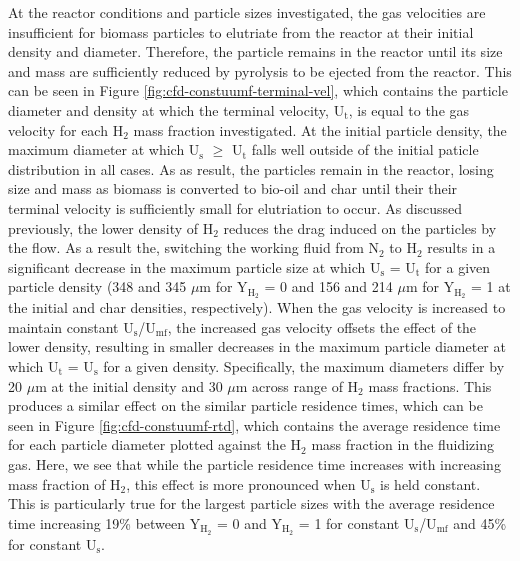 At the reactor conditions and particle sizes investigated, the gas velocities are insufficient for biomass particles to elutriate from the reactor at their initial density and diameter. Therefore, the particle remains in the reactor until its size and mass are sufficiently reduced by pyrolysis to be ejected from the reactor. This can be seen in Figure \ref{fig:cfd-constuumf-terminal-vel}, which contains the particle diameter and density at which the terminal velocity, U$_\text{t}$, is equal to the gas velocity for each H$_2$ mass fraction investigated. At the initial particle density, the maximum diameter at which U$_\text{s}$ $\ge$ U$_\text{t}$ falls well outside of the initial paticle distribution in all cases. As as result, the particles remain in the reactor, losing size and mass as biomass is converted to bio-oil and char until their their terminal velocity is sufficiently small for elutriation to occur. As discussed previously, the lower density of H$_2$ reduces the drag induced on the particles by the flow. As a result the, switching the working fluid from N$_2$ to H$_2$ results in a significant decrease in the maximum particle size at which U$_\text{s}$ = U$_\text{t}$ for a given particle density (348 and 345 $\mu$m for Y$_{\text{H}_2}$ = 0 and 156 and 214 $\mu$m for Y$_{\text{H}_2}$ = 1 at the initial and char densities, respectively). When the gas velocity is increased to maintain constant U$_\text{s}$/U$_\text{mf}$, the increased gas velocity offsets the effect of the lower density, resulting in smaller decreases in the maximum particle diameter at which U$_\text{t}$ = U$_\text{s}$ for a given density. Specifically, the maximum diameters differ by 20 $\mu$m at the initial density and 30 $\mu$m across range of H$_2$ mass fractions. This produces a similar effect on the similar particle residence times, which can be seen in Figure \ref{fig:cfd-constuumf-rtd}, which contains the average residence time for each particle diameter plotted against the H$_2$ mass fraction in the fluidizing gas. Here, we see that while the particle residence time increases with increasing mass fraction of H$_2$, this effect is more pronounced when U$_\text{s}$ is held constant. This is particularly true for the largest particle sizes with the average residence time increasing 19\% between Y$_{\text{H}_2}$ = 0 and Y$_{\text{H}_2}$ = 1 for constant U$_\text{s}$/U$_\text{mf}$ and 45\% for constant U$_\text{s}$.

